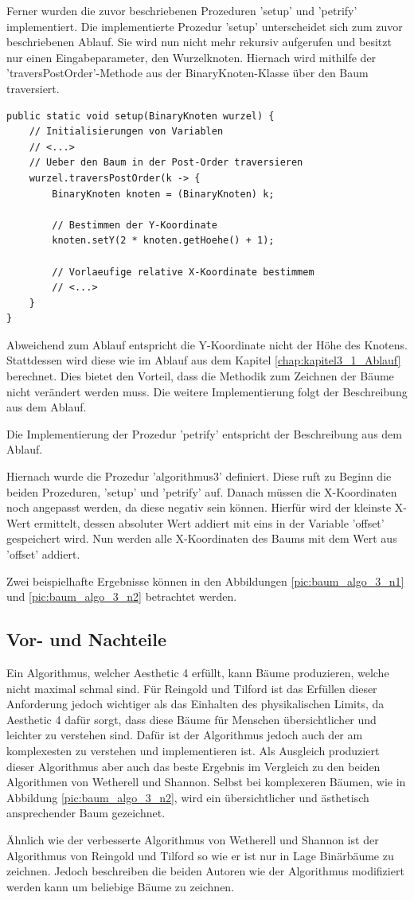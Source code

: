 Ferner wurden die zuvor beschriebenen Prozeduren 'setup' und 'petrify' implementiert. Die implementierte Prozedur
'setup' unterscheidet sich zum zuvor beschriebenen Ablauf. Sie wird nun nicht mehr rekursiv aufgerufen und besitzt 
nur einen Eingabeparameter, den Wurzelknoten. Hiernach wird mithilfe der 'traversPostOrder'-Methode aus der 
BinaryKnoten-Klasse über den Baum traversiert.

\begin{lstlisting}[caption=Ausschnitt aus der setup-Prozedur, label=code:algo3_setup]
public static void setup(BinaryKnoten wurzel) {
    // Initialisierungen von Variablen
    // <...>
    // Ueber den Baum in der Post-Order traversieren
    wurzel.traversPostOrder(k -> {
        BinaryKnoten knoten = (BinaryKnoten) k;

        // Bestimmen der Y-Koordinate
        knoten.setY(2 * knoten.getHoehe() + 1);

        // Vorlaeufige relative X-Koordinate bestimmem
        // <...>
    }
}
\end{lstlisting}

Abweichend zum Ablauf entspricht die Y-Koordinate nicht der Höhe des Knotens. Stattdessen wird diese wie im 
Ablauf aus dem Kapitel \ref{chap:kapitel3_1_Ablauf} berechnet. Dies bietet den Vorteil, 
dass die Methodik zum Zeichnen der Bäume nicht verändert werden muss. Die weitere Implementierung folgt 
der Beschreibung aus dem Ablauf.

Die Implementierung der Prozedur 'petrify' entspricht der Beschreibung aus dem Ablauf.

Hiernach wurde die Prozedur 'algorithmus3' definiert. Diese ruft zu Beginn die beiden Prozeduren, 
'setup' und 'petrify' auf. Danach müssen die X-Koordinaten noch angepasst werden, da diese 
negativ sein können. Hierfür wird der kleinste X-Wert ermittelt, dessen absoluter Wert 
addiert mit eins in der Variable 'offset' gespeichert wird. Nun werden alle X-Koordinaten des 
Baums mit dem Wert aus 'offset' addiert. 

Zwei beispielhafte Ergebnisse können in den Abbildungen \ref{pic:baum_algo_3_n1} 
und \ref{pic:baum_algo_3_n2} betrachtet werden. 


\subsection{Vor- und Nachteile}
Ein Algorithmus, welcher Aesthetic 4 erfüllt, kann Bäume produzieren, welche nicht maximal schmal sind. 
Für Reingold und Tilford ist das Erfüllen dieser Anforderung jedoch wichtiger als das Einhalten des physikalischen Limits, 
da Aesthetic 4 dafür sorgt, dass diese Bäume für Menschen übersichtlicher und leichter zu verstehen sind.\cite[]{q2} Dafür ist der Algorithmus 
jedoch auch der am komplexesten zu verstehen und implementieren ist. Als Ausgleich produziert dieser Algorithmus aber auch das beste Ergebnis
im Vergleich zu den beiden Algorithmen von Wetherell und Shannon. Selbst bei komplexeren Bäumen, wie in Abbildung \ref{pic:baum_algo_3_n2},
wird ein übersichtlicher und ästhetisch ansprechender Baum gezeichnet. 

Ähnlich wie der verbesserte Algorithmus von Wetherell und Shannon ist der Algorithmus von Reingold und Tilford so wie er ist nur in Lage
Binärbäume zu zeichnen. Jedoch beschreiben die beiden Autoren wie der Algorithmus modifiziert werden kann um beliebige Bäume zu zeichnen.

